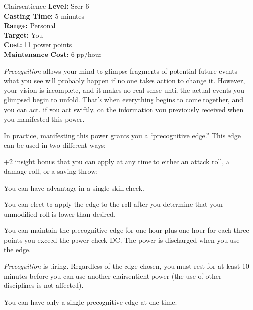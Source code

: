 {Clairsentience}
{
	\textbf{Level:}
	Seer 6\\
	\textbf{Casting Time:}
	5 minutes\\
	\textbf{Range:}
	Personal\\
	\textbf{Target:}
	You\\
	\textbf{Cost:}
	11 power points\\
	\textbf{Maintenance Cost:}
	6 pp/hour\\
}
{
	\emph{Precognition} allows your mind to glimpse fragments of potential future events---what you see will probably happen if no one takes action to change it. However, your vision is incomplete, and it makes no real sense until the actual events you glimpsed begin to unfold. That's when everything begins to come together, and you can act, if you act swiftly, on the information you previously received when you manifested this power.

	In practice, manifesting this power grants you a ``precognitive edge.'' This edge can be used in two different ways:
	\begin{enumerate*}
	\item +2 insight bonus that you can apply at any time to either an attack roll, a damage roll, or a saving throw;
	\item You can have advantage in a single skill check.
	\end{enumerate*}

	You can elect to apply the edge to the roll after you determine that your unmodified roll is lower than desired.

	You can maintain the precognitive edge for one hour plus one hour for each three points you exceed the power check DC. The power is discharged when you use the edge.

	\emph{Precognition} is tiring. Regardless of the edge chosen, you must rest for at least 10 minutes before you can use another clairsentient power (the use of other disciplines is not affected).

	You can have only a single precognitive edge at one time.
}